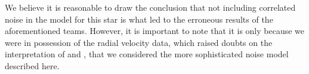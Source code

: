 \documentclass[apjl]{emulateapj}
\begin{document}
We believe it is reasonable to draw the conclusion that not including correlated noise in the model for this star is what led to the erroneous results of the aforementioned teams. However, it is important to note that it is only because we were in possession of the radial velocity data, which raised doubts on the interpretation of \citeauthor{esteves13} and \citeauthor{sliski14}, that we considered the more sophisticated noise model described here.











\end{document}
